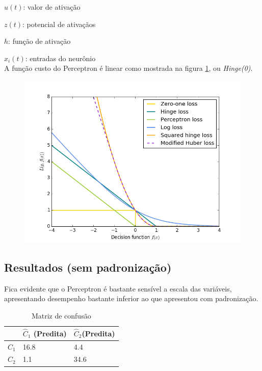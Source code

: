 \documentclass[11pt,a4paper]{article}
\numberwithin{equation}{section}
\begin{document}
$u(t)$: valor de ativação

$z(t)$: potencial de ativaçãos

$h$: função de ativação

$x_i(t)$: entradas do neurônio
\\
A função custo do Perceptron é linear como mostrada na figura \ref{fig:lossfunc}, ou \textit{Hinge(0)}.

\begin{figure}[H]
\centering
  \includegraphics[width=0.5\linewidth]{../img/loss_function.png}
  \label{fig:lossfunc}
\end{figure}%

\subsection{Resultados (sem padronização)}

Fica evidente que o Perceptron é bastante sensível a escala das variáveis, apresentando desempenho bastante inferior ao que apresentou com padronização.
\begin{table}[H]
\centering
\caption{Matriz de confusão}
\begin{tabular}{l l l}
\hline
 & \textbf{$\hat{C}_1$ (Predita)} & \textbf{$\hat{C}_2$(Predita)}\\
\hline
$C_1$ &  16.8 & 4.4 \\
$C_2$ &  1.1 & 34.6 \\
\hline
\end{tabular}
\end{table}
\end{document}
